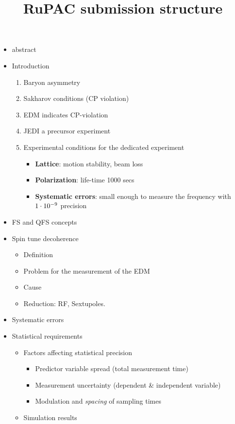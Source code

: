 \documentclass{article}
\begin{document}
\title{RuPAC submission structure}
\date{}
\maketitle
	\begin{itemize}
		\item abstract
		\item Introduction
		\begin{enumerate}
			\item Baryon asymmetry
			\item Sakharov conditions (CP violation)
			\item EDM indicates CP-violation
			\item JEDI a precursor experiment
			\item Experimental conditions for the dedicated experiment
				\begin{itemize}
					\item \textbf{Lattice}: motion stability, beam loss
					\item \textbf{Polarization}: life-time 1000 secs
					\item \textbf{Systematic errors}: small enough to measure the frequency with ${1}\cdot 10^{-9}$ precision				
				\end{itemize}
		\end{enumerate}
		\item FS and QFS concepts
		\item Spin tune decoherence
			\begin{itemize}
				\item Definition
				\item Problem for the measurement of the EDM
				\item Cause
				\item Reduction: RF, Sextupoles.
			\end{itemize}
		\item Systematic errors
		\item Statistical requirements
			\begin{itemize}
				\item Factors affecting statistical precision
					\begin{itemize}
						\item Predictor variable spread (total measurement time)
						\item Measurement uncertainty (dependent \& independent variable)
						\item Modulation and \emph{spacing} of sampling times
					\end{itemize}
				\item Simulation results
			\end{itemize}
	\end{itemize}
	
\end{document}
